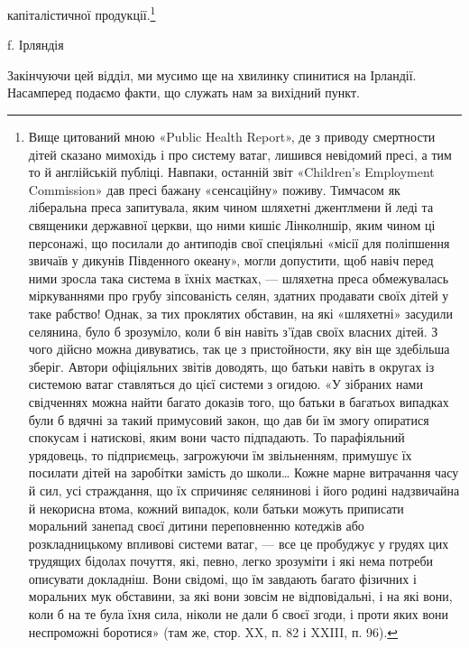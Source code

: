 капіталістичної продукції.\footnote{
Вище цитований мною «Public Health Report», де з приводу
смертности дітей сказано мимохідь і про систему ватаг, лишився невідомий
пресі, а тим то й англійській публіці. Навпаки, останній звіт «Children’s
Employment Commission» дав пресі бажану «сенсаційну» поживу.
Тимчасом як ліберальна преса запитувала, яким чином шляхетні джентлмени
й леді та священики державної церкви, що ними кишіє Лінколншір,
яким чином ці персонажі, що посилали до антиподів свої спеціяльні
«місії для поліпшення звичаїв у дикунів Південного океану», могли допустити,
щоб навіч перед ними зросла така система в їхніх маєтках, —
шляхетна преса обмежувалась міркуваннями про грубу зіпсованість
селян, здатних продавати своїх дітей у таке рабство! Однак, за тих проклятих
обставин, на які «шляхетні» засудили селянина, було б зрозуміло,
коли б він навіть з’їдав своїх власних дітей. З чого дійсно можна
дивуватись, так це з пристойности, яку він ще здебільша зберіг. Автори
офіціяльних звітів доводять, що батьки навіть в округах із системою ватаг
ставляться до цієї системи з огидою. «У зібраних нами свідченнях можна
найти багато доказів того, що батьки в багатьох випадках були б вдячні
за такий примусовий закон, що дав би їм змогу опиратися спокусам і
натискові, яким вони часто підпадають. То парафіяльний урядовець,
то підприємець, загрожуючи їм звільненням, примушує їх посилати дітей
на заробітки замість до школи\dots{} Кожне марне витрачання часу й сил,
усі страждання, що їх спричиняє селянинові і його родині надзвичайна
й некорисна втома, кожний випадок, коли батьки можуть приписати
моральний занепад своєї дитини переповненню котеджів або розкладницькому
впливові системи ватаг, — все це пробуджує у грудях цих трудящих
бідолах почуття, які, певно, легко зрозуміти і які нема потреби описувати
докладніш. Вони свідомі, що їм завдають багато фізичних і моральних
мук обставини, за які вони зовсім не відповідальні, і на які вони,
коли б на те була їхня сила, ніколи не дали б своєї згоди, і проти яких
вони неспроможні боротися» (там же, стор. XX, п. 82 і XXIII, п. 96).
}

f. Ірляндія

Закінчуючи цей відділ, ми мусимо ще на хвилинку спинитися
на Ірландії. Насамперед подаємо факти, що служать нам
за вихідний пункт.
